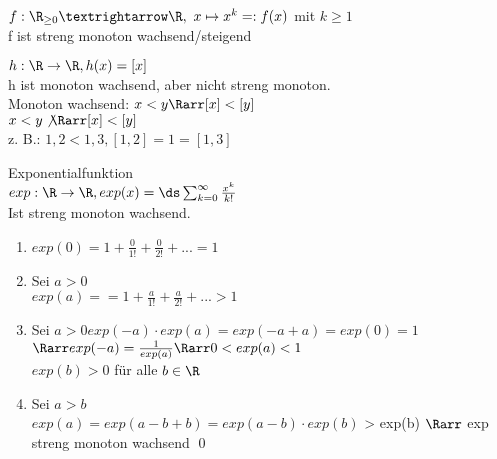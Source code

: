 \begin{enumerate}
\item{$f:\R_{\geq 0}→\R,\ x\mapsto x^k =:f(x)$ mit $k\geq 1$\\%
f ist streng monoton wachsend/steigend 
\item{$h: \R \to \R, h(x) = [x]$}\\
h ist monoton wachsend, aber nicht streng monoton.\\
Monoton wachsend: $x < y \Rarr [x] < [y]$\\
$x < y \not\Rarr [x] < [y]$\\
z. B.: $1,2 < 1,3 , [1,2] = 1 = [1,3] $}
\item{Exponentialfunktion\\
$exp: \R \to \R, exp(x)= \ds\sum_{k=0}^{\infty} \frac{x^k}{k!}$\\
Ist streng monoton wachsend.\\
\bew
\begin{enumerate}
\item{$exp(0) = 1 + \frac{0}{1!} + \frac{0}{2!} + ... = 1$}
\item{Sei $a > 0$\\
$exp(a) = = 1 + \frac{a}{1!} + \frac{a}{2!} + ... > 1$}
\item{Sei $a > 0 exp(-a) \cdot exp(a) = exp(-a + a) = exp(0) = 1$\\
$\Rarr exp(-a) = \frac{1}{exp(a)} \Rarr 0 < exp(a) < 1$\\
$exp(b) > 0$ für alle $b \in \R$}
\item{Sei $a > b$\\
$exp(a) = exp(a - b + b) = exp(a - b) \cdot exp(b)$ %
> exp(b) $\Rarr$ exp streng monoton wachsend \qed }
\end{enumerate}
}
\end{enumerate}
%
